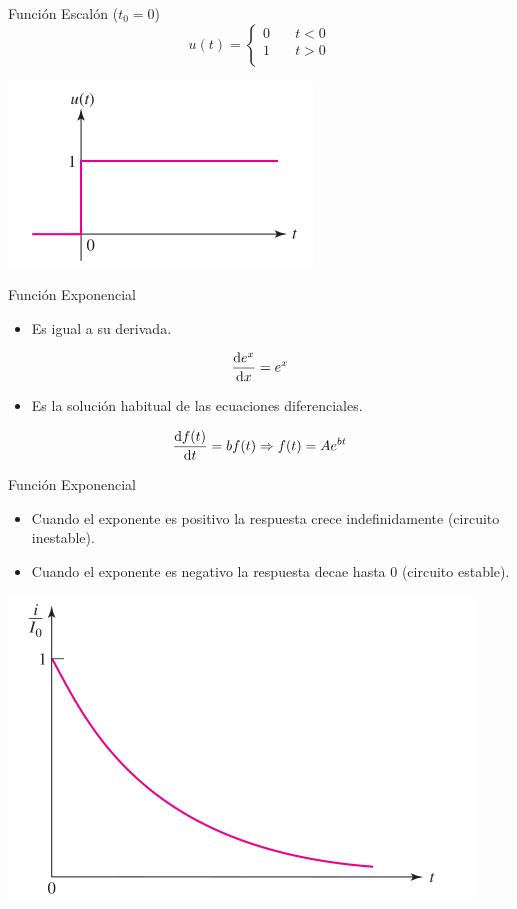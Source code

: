 \documentclass[aspectratio=169, usenames,svgnames,dvipsnames]{beamer}
\begin{document}
\begin{frame}[label={sec:orgc8adc3e}]{Función Escalón (\(t_0 = 0\))}
\[   
u(t) = 
     \begin{cases}
       0 &\quad t < 0\\
       1 &\quad t > 0\\
     \end{cases}
\]
\begin{center}
\includegraphics[height=0.5\textheight]{../figs/funcion_escalon0.pdf}
\end{center}
\end{frame}

\begin{frame}[label={sec:orgfdaee4d}]{Función Exponencial}
\begin{itemize}
\item Es igual a su derivada.
\end{itemize}
\[
\diff{e^x}{x} = e^x
\]

\begin{itemize}
\item Es la solución habitual de las ecuaciones diferenciales.
\end{itemize}

\[
  \diff{f(t)}{t} = b f(t) \Rightarrow f(t) = A e^{bt}
\]
\end{frame}
\begin{frame}[label={sec:org9f654a2}]{Función Exponencial}
\begin{itemize}
\item Cuando el exponente es positivo la respuesta crece indefinidamente (circuito inestable).
\item Cuando el exponente es negativo la respuesta decae hasta 0 (circuito estable).
\end{itemize}
\begin{center}
\includegraphics[height=0.5\textheight]{../figs/exp_decreciente.pdf}
\end{center}
\end{frame}
\end{document}
